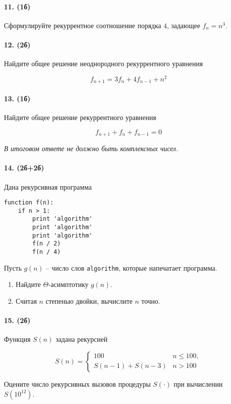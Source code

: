 \documentclass{article}
\begin{document}
\paragraph{11. (1б)} Сформулируйте рекуррентное соотношение порядка $4$, задающее $f_n=n^3$.

\paragraph{12. (2б)} Найдите общее решение неоднородного рекуррентного уравнения

$$f_{n+1}=3f_n+4f_{n-1}+n^2$$

\paragraph{13. (1б)} Найдите общее решение рекуррентного уравнения

$$f_{n+1}+f_n+f_{n-1}=0$$

\textit{В итоговом ответе не должно быть комплексных чисел.}


\paragraph{14. (2б+2б)} Дана рекурсивная программа

\begin{lstlisting}
function f(n):
    if n > 1:
        print 'algorithm'
        print 'algorithm'
        print 'algorithm'
        f(n / 2)
        f(n / 4)
\end{lstlisting}

Пусть $g(n)$ -- число слов \texttt{algorithm}, которые напечатает программа. 
\begin{enumerate}
    \item Найдите $\Theta$-асимптотику $g(n)$.
    \item Считая $n$ степенью двойки, вычислите $n$ точно.
\end{enumerate}


\paragraph{15. (2б)} Функция $S(n)$ задана рекурсией

$$S(n)=\left\{\begin{matrix}100& n \leq 100, \\ S(n-1)+S(n-3)& n >100\end{matrix}\right.$$

Оцените число рекурсивных вызовов процедуры $S(\cdot)$ при вычислении $S(10^{12})$.
\end{document}
